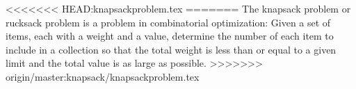 <<<<<<< HEAD:knapsackproblem.tex
=======
The knapsack problem or rucksack problem is a problem in combinatorial optimization: Given a set of items, each with a weight and a value, determine the number of each item to include in a collection so that the total weight is less than or equal to a given limit and the total value is as large as possible.
>>>>>>> origin/master:knapsack/knapsackproblem.tex

